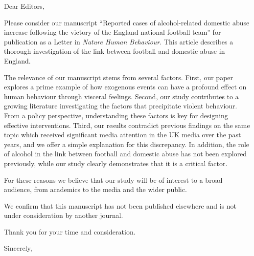 \documentclass{letter}
\begin{document}
\begin{letter}
{}
\opening{Dear Editors,} %

Please consider our manuscript ``Reported cases of alcohol-related domestic abuse increase following the victory of the England national football team'' for publication as a Letter in \textit{Nature Human Behaviour}. This article describes a thorough investigation of the link between football and domestic abuse in England.

The relevance of our manuscript stems from several factors. First, our paper explores a prime example of how exogenous events can have a profound effect on human behaviour through visceral feelings. Second, our study contributes to a growing literature investigating the factors that precipitate violent behaviour. From a policy perspective, understanding these factors is key for designing effective interventions. Third, our results contradict previous findings on the same topic which received significant media attention in the UK media over the past years, and we offer a simple explanation for this discrepancy. In addition, the role of alcohol in the link between football and domestic abuse has not been explored previously, while our study clearly demonstrates that it is a critical factor.


For these reasons we believe that our study will be of interest to a broad audience, from academics to the media and the wider public.

We confirm that this manuscript has not been published elsewhere and is not under consideration by another journal.

Thank you for your time and consideration.

\closing{Sincerely,}



\end{letter}
\end{document}
